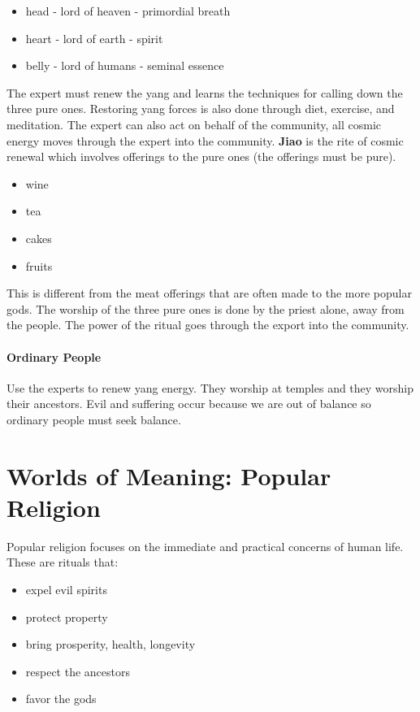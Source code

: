 \documentclass{article}
\begin{document}
\begin{itemize}
	\item head - lord of heaven - primordial breath
	\item heart - lord of earth - spirit
	\item belly - lord of humans - seminal essence
\end{itemize}

The expert must renew the yang and learns the techniques for calling down the three pure ones. Restoring yang forces is also done through diet, exercise, and meditation. The expert can also act on behalf of the community, all cosmic energy moves through the expert into the community. \textbf{Jiao} is the rite of cosmic renewal which involves offerings to the pure ones (the offerings must be pure).
\begin{itemize}
	\item wine
	\item tea
	\item cakes
	\item fruits
\end{itemize}
This is different from the meat offerings that are often made to the more popular gods. The worship of the three pure ones is done by the priest alone, away from the people. The power of the ritual goes through the export into the community.

\paragraph{Ordinary People}
\label{par:ordinary_people}
Use the experts to renew yang energy. They worship at temples and they worship their ancestors. Evil and suffering occur because we are out of balance so ordinary people must seek balance.

\section*{Worlds of Meaning: Popular Religion}
\label{sec:worlds_of_meaning_popular_religion}
Popular religion focuses on the immediate and practical concerns of human life. These are rituals that:
\begin{itemize}
	\item expel evil spirits
	\item protect property
	\item bring prosperity, health, longevity
	\item respect the ancestors
	\item favor the gods
\end{itemize}
\end{document}
